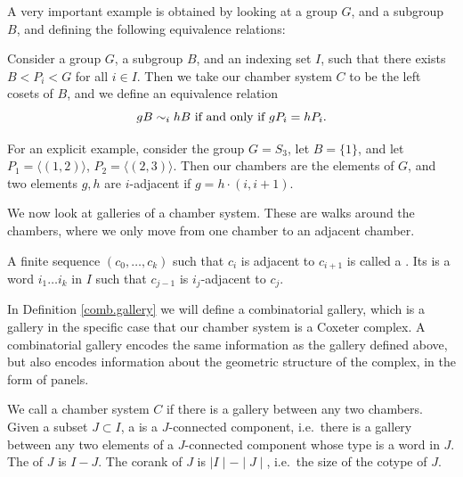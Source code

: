 \documentclass[11pt]{article}
\begin{document}
A very important example is obtained by looking at a group $G$, and a subgroup $B$, and defining the following equivalence relations: 

\begin{example}\label{S3}
    Consider a group $G$, a subgroup $B$, and an indexing set $I$, such that there exists $B<P_i<G$ for all $i\in I$. Then we take our chamber system $C$ to be the left cosets of $B$, and we define an equivalence relation
    \[gB\sim_{i}hB \textnormal{ if and only if }gP_i=hP_i.\]

    For an explicit example, consider the group $G=S_3$, let $B=\{1\}$, and let $P_1=\langle (1,2)\rangle$, $P_2=\langle (2,3)\rangle$. Then our chambers are the elements of $G$, and two elements $g,h$ are $i$-adjacent if $g=h\cdot(i,i+1)$. 
\end{example}

We now look at galleries of a chamber system. These are walks around the chambers, where we only move from one chamber to an adjacent chamber. 

\begin{definition}\label{gallery}
    A finite sequence $(c_0,\hdots ,c_k)$ such that $c_i$ is adjacent to $c_{i+1}$ is called a . Its  is a word $i_1\hdots i_k$ in $I$ such that  $c_{j-1}$ is $i_j$-adjacent to $c_{j}$. 
\end{definition}

In Definition \ref{comb.gallery} we will define a combinatorial gallery, which is a gallery in the specific case that our chamber system is a Coxeter complex. A combinatorial gallery encodes the same information as the gallery defined above, but also encodes information about the geometric structure of the complex, in the form of panels. 

\begin{definition}\label{residue}
    We call a chamber system $C$  if there is a gallery between any two chambers. Given a subset $J\subset I$, a  is a $J$-connected component, i.e.\ there is a gallery between any two elements of a $J$-connected component whose type is a word in $J$. The  of $J$ is $I-J$. The corank of $J$ is $\mid I\mid -\mid J\mid $, i.e.\ the size of the cotype of $J$. 
\end{definition}
\end{document}
